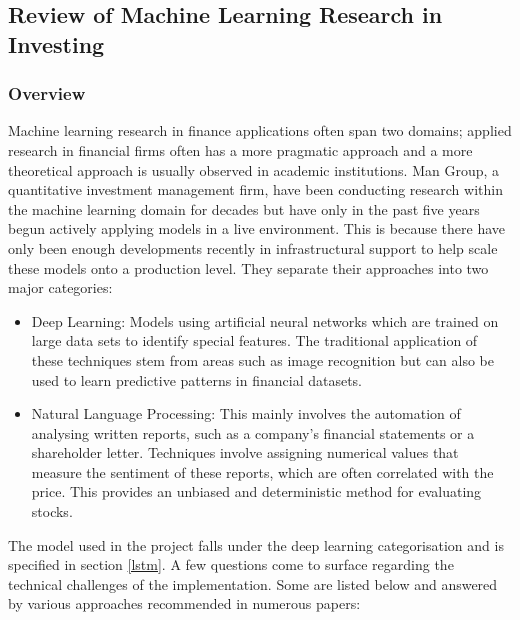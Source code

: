 \documentclass[10pt,onecolumn,letterpaper]{article}
\begin{document}
\subsection{Review of Machine Learning Research in Investing}  \label{ML_research}

\subsubsection{Overview}

Machine learning research in finance applications often span two domains; applied research in financial firms often has a more pragmatic approach and a more theoretical approach is usually observed in academic institutions. Man Group, a quantitative investment management firm, have been conducting research\cite{Man_Group} within the machine learning domain for decades but have only in the past five years begun actively applying models in a live environment. This is because there have only been enough developments recently in infrastructural support to help scale these models onto a production level. They separate their approaches into two major categories:
\begin{itemize}
	\item Deep Learning: Models using artificial neural networks which are trained on large data sets to identify special features. The traditional application of these techniques stem from areas such as image recognition but can also be used to learn predictive patterns in financial datasets. 
	\item Natural Language Processing: This mainly involves the automation of analysing written reports, such as a company's financial statements or a shareholder letter. Techniques involve assigning numerical values that measure the sentiment of these reports, which are often correlated with the price. This provides an unbiased and deterministic method for evaluating stocks. 
\end{itemize}
The model used in the project falls under the deep learning categorisation and is specified in section \ref{lstm}. A few questions come to surface regarding the technical challenges of the implementation. Some are listed below and answered by various approaches recommended in numerous papers: 
\end{document}
